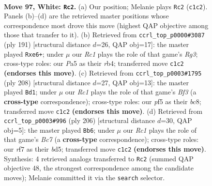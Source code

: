 \documentclass[11pt]{article}
\begin{document}
\clearpage

\begin{figure}[p]\centering
\begin{subfigure}{0.46\textwidth}\centering
\resizebox{\linewidth}{!}{%
\newchessgame
\chessboard[
  setfen={8/5r2/p7/P1pk1p1p/1p3P1P/4P1P1/1P6/2R3K1 w - - 5 97},
  showmover=false,
  pgfstyle=straightmove, color=movearrow, markmove={c1-c2}
]}
\caption{}
\end{subfigure}\hfill
\begin{subfigure}{0.46\textwidth}\centering
\resizebox{\linewidth}{!}{%
\newchessgame
\chessboard[
  setfen={4k3/4p3/p2pP1r1/P4p1p/1RP4P/4KPP1/8/8 b - - 0 96},
  showmover=false,
  pgfstyle=straightmove, color=movearrow, markmove={g6-e6}
]}
\caption{}
\end{subfigure}
\\[4pt]
\begin{subfigure}{0.46\textwidth}\centering
\resizebox{\linewidth}{!}{%
\newchessgame
\chessboard[
  setfen={2b5/p4p2/1p1k2p1/7p/1P1K1P1P/P4BP1/8/8 w - - 37 105},
  showmover=false,
  pgfstyle=straightmove, color=movearrow, markmove={f3-d1}
]}
\caption{}
\end{subfigure}\hfill
\begin{subfigure}{0.46\textwidth}\centering
\resizebox{\linewidth}{!}{%
\newchessgame
\chessboard[
  setfen={8/2Bk4/5p2/3b1Pp1/3Pp1Pp/4P2P/8/4K3 w - - 92 104},
  showmover=false,
  pgfstyle=straightmove, color=movearrow, markmove={c7-b6}
]}
\caption{}
\end{subfigure}
\caption{\textbf{Move 97, White: \texttt{Rc2}.} (a) Our position; Melanie plays \texttt{Rc2} (\texttt{c1c2}). Panels (b)--(d) are the retrieved master positions whose correspondence most drove this move (highest QAP objective among those that transfer to it). (b) Retrieved from \texttt{ccrl\_top\_p0000\#3087} (ply 191) [structural distance $d$=26, QAP obj=17]: the master played \texttt{Rxe6+}; under $\mu$ our \emph{Rc1} plays the role of that game's \emph{Rg3}; cross-type roles: our \emph{P}a5 as their \emph{r}b4; transferred move \texttt{c1c2} \textbf{(endorses this move)}. (c) Retrieved from \texttt{ccrl\_top\_p0003\#1795} (ply 208) [structural distance $d$=27, QAP obj=13]: the master played \texttt{Bd1}; under $\mu$ our \emph{Rc1} plays the role of that game's \emph{Bf3} (a \textbf{cross-type} correspondence); cross-type roles: our \emph{p}f5 as their \emph{b}c8; transferred move \texttt{c1c2} \textbf{(endorses this move)}. (d) Retrieved from \texttt{ccrl\_top\_p0003\#996} (ply 206) [structural distance $d$=30, QAP obj=5]: the master played \texttt{Bb6}; under $\mu$ our \emph{Rc1} plays the role of that game's \emph{Bc7} (a \textbf{cross-type} correspondence); cross-type roles: our \emph{r}f7 as their \emph{b}d5; transferred move \texttt{c1c2} \textbf{(endorses this move)}. Synthesis: 4 retrieved analogs transferred to \texttt{Rc2} (summed QAP objective 48, the strongest correspondence among the candidate moves); Melanie committed it via the \texttt{search} selector.}
\label{fig:thought-m192}
\end{figure}
\end{document}
